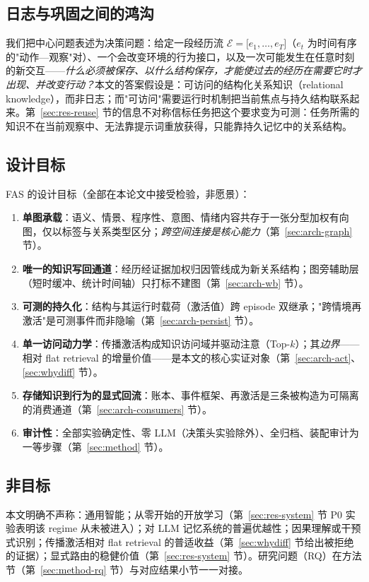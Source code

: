 \documentclass[10pt,a4paper]{ctexart}
\begin{document}
\subsection{日志与巩固之间的鸿沟}
我们把中心问题表述为决策问题：给定一段经历流 $\mathcal{E}={[}e_1,\ldots,e_T{]} $（$e_t$ 为时间有序的"动作—观察"对）、一个会改变环境的行为接口，以及一次可能发生在任意时刻的新交互——\emph{什么必须被保存、以什么结构保存，才能使过去的经历在需要它时才出现、并改变行动？}本文的答案假设是：可访问的结构化关系知识（relational knowledge），而非日志；而"可访问"需要运行时机制把当前焦点与持久结构联系起来。第~\ref{sec:res-reuse} 节的信息不对称信标任务把这个要求变为可测：任务所需的知识不在当前观察中、无法靠提示词重放获得，只能靠持久记忆中的关系结构。

\subsection{设计目标}
FAS 的设计目标（全部在本论文中接受检验，非愿景）：
\begin{enumerate}
\item \textbf{单图承载}：语义、情景、程序性、意图、情绪内容共存于一张分型加权有向图，仅以标签与关系类型区分；\emph{跨空间连接是核心能力}（第~\ref{sec:arch-graph} 节）。
\item \textbf{唯一的知识写回通道}：经历经证据加权归因管线成为新关系结构；图旁辅助层（短时缓冲、统计时间轴）只打标不建图（第~\ref{sec:arch-wb} 节）。
\item \textbf{可测的持久化}：结构与其运行时载荷（激活值）跨 episode 双继承；"跨情境再激活"是可测事件而非隐喻（第~\ref{sec:arch-persist} 节）。
\item \textbf{单一访问动力学}：传播激活构成知识访问域并驱动注意（Top-$k$）；其\emph{边界}——相对 flat retrieval 的增量价值——是本文的核心实证对象（第~\ref{sec:arch-act}、\ref{sec:whydiff} 节）。
\item \textbf{存储知识到行为的显式回流}：账本、事件框架、再激活是三条被构造为可隔离的消费通道（第~\ref{sec:arch-consumers} 节）。
\item \textbf{审计性}：全部实验确定性、零 LLM（决策头实验除外）、全归档、装配审计为一等步骤（第~\ref{sec:method} 节）。
\end{enumerate}

\subsection{非目标}
本文明确不声称：通用智能；从零开始的开放学习（第~\ref{sec:res-system} 节 P0 实验表明该 regime 从未被进入）；对 LLM 记忆系统的普遍优越性；因果理解或干预式识别；传播激活相对 flat retrieval 的普适收益（第~\ref{sec:whydiff} 节给出被拒绝的证据）；显式路由的稳健价值（第~\ref{sec:res-system} 节）。研究问题（RQ）在方法节（第~\ref{sec:method-rq} 节）与对应结果小节一一对接。
\end{document}
